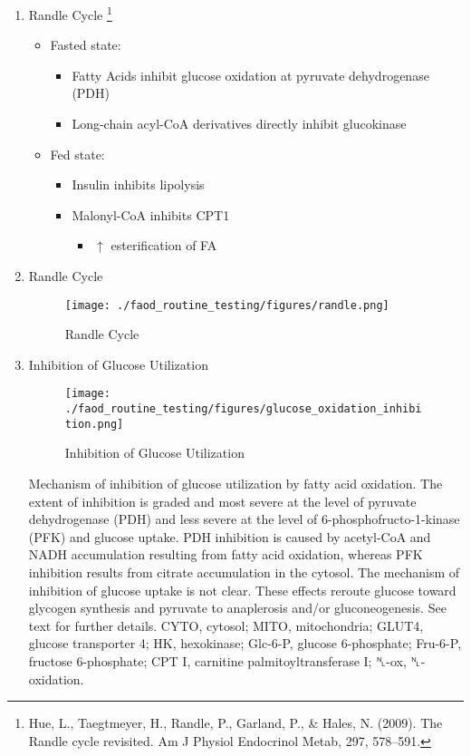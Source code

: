 \documentclass{scrartcl}
\begin{document}
\begin{enumerate}
\item Randle Cycle \footnote{Hue, L., Taegtmeyer, H., Randle, P., Garland, P., \& Hales,
N. (2009). The Randle cycle revisited. Am J Physiol Endocrinol Metab,
297, 578–591.}
\label{sec:org64daa74}
\begin{itemize}
\item Fasted state:
\begin{itemize}
\item Fatty Acids inhibit glucose oxidation at pyruvate dehydrogenase
(PDH)
\item Long-chain acyl-CoA derivatives directly inhibit glucokinase
\end{itemize}
\item Fed state:
\begin{itemize}
\item Insulin inhibits lipolysis
\item Malonyl-CoA inhibits CPT1
\begin{itemize}
\item \(\uparrow\) esterification of FA
\end{itemize}
\end{itemize}
\end{itemize}

\item Randle Cycle
\label{sec:org3757b53}
\begin{figure}[htbp]
\centering
\texttt{[image: ./faod\_routine\_testing/figures/randle.png]}
\caption{\label{fig:org700d930}
Randle Cycle}
\end{figure}

\item Inhibition of Glucose Utilization
\label{sec:org24b720a}
\begin{figure}[htbp]
\centering
\texttt{[image: ./faod\_routine\_testing/figures/glucose\_oxidation\_inhibition.png]}
\caption{\label{fig:org854e435}
Inhibition of Glucose Utilization}
\end{figure}

Mechanism of inhibition of glucose utilization by fatty acid
oxidation. The extent of inhibition is graded and most severe at the
level of pyruvate dehydrogenase (PDH) and less severe at the level of
6-phosphofructo-1-kinase (PFK) and glucose uptake. PDH inhibition is
caused by acetyl-CoA and NADH accumulation resulting from fatty acid
oxidation, whereas PFK inhibition results from citrate accumulation
in the cytosol. The mechanism of inhibition of glucose uptake is not
clear. These effects reroute glucose toward glycogen synthesis and
pyruvate to anaplerosis and/or gluconeogenesis. See text for further
details. CYTO, cytosol; MITO, mitochondria; GLUT4, glucose transporter
4; HK, hexokinase; Glc-6-P, glucose 6-phosphate; Fru-6-P, fructose
6-phosphate; CPT I, carnitine palmitoyltransferase I; ␤-ox,
␤-oxidation.


\end{enumerate}
\end{document}
